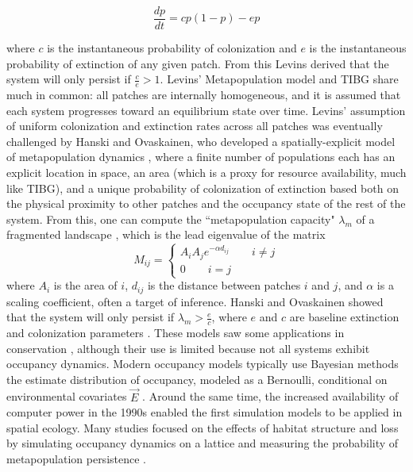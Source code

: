 \documentclass[]{article}
\begin{document}
\[\frac{dp}{dt} = cp(1-p) - ep\]

where \(c\) is the instantaneous probability of colonization and \(e\)
is the instantaneous probability of extinction of any given patch. From
this Levins derived that the system will only persist if
\(\frac{c}{e} > 1\). Levins' Metapopulation model and TIBG share much in
common: all patches are internally homogeneous, and it is
assumed that each system progresses toward an equilibrium state over
time. Levins' assumption of uniform colonization and extinction rates across
all patches was eventually challenged by Hanski and Ovaskainen, who
developed a spatially-explicit model of metapopulation dynamics
\citep{hanski_practical_1994}, where a finite number of populations each has
an explicit location in space, an area (which is a proxy for resource
availability, much like TIBG), and a unique probability of colonization
of extinction based both on the physical proximity to other patches and
the occupancy state of the rest of the system. From this, one can compute the ``metapopulation capacity" $\lambda_m$ of a fragmented landscape \cite{ovaskainen_metapopulation_2002}, which is the lead eigenvalue of the matrix
$$M_{ij }= \begin{cases}A_iA_je^{-\alpha d_{ij}} \quad\quad i \neq j\\ 0 \quad\quad i = j\end{cases}$$
where $A_i$ is the area of $i$, $d_{ij}$ is the distance between patches $i$ and $j$, and $\alpha$ is a scaling coefficient, often a target of inference. Hanski and Ovaskainen showed that the system will only persist if $\lambda_m > \frac{e}{c}$, where $e$ and $c$ are baseline extinction and colonization parameters \cite{ovaskainen_metapopulation_2002}. These models saw some applications in conservation \cite{macpherson_metapopulation_2011,hill_effects_1996}, although their use is limited because not all systems exhibit occupancy dynamics. Modern occupancy models typically use Bayesian methods the estimate distribution of occupancy, modeled as a Bernoulli, conditional on environmental covariates $\vec{E}$ \cite{fletcher_spatial_2019}.
Around the same time, the increased availability of computer power in the 1990s enabled the first simulation models to be applied in spatial ecology. Many studies focused on the
effects of habitat structure and loss by simulating occupancy dynamics
on a lattice and measuring the probability of metapopulation persistence
\citep{bascompte_habitat_1996}.
\end{document}
